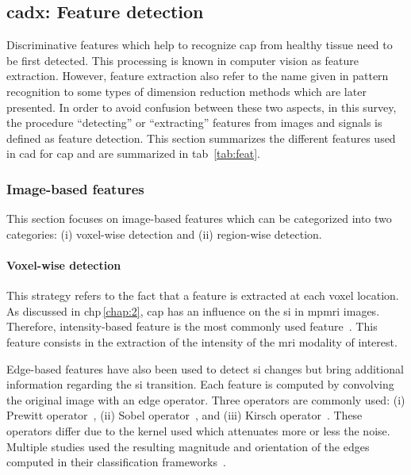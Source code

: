 \subsection{\acs*{cadx}: Feature detection} \label{subsec:chp3:img-clas:CADX-fea-dec}

Discriminative features which help to recognize \ac{cap} from healthy tissue need to be first detected.
This processing is known in computer vision as feature extraction. 
However, feature extraction also refer to the name given in pattern recognition to some types of dimension reduction methods which are later presented.
In order to avoid confusion between these two aspects, in this survey, the procedure ``detecting'' or ``extracting'' features from images and signals is defined as feature detection.
This section summarizes the different features used in \ac{cad} for \ac{cap} and are summarized in \acs{tab}~\ref{tab:feat}.  



\subsubsection{Image-based features}\label{subsubsec:chp3:img-clas:CADX-fea-dec:Img-fea}

This section focuses on image-based features which can be categorized into two categories: (i) voxel-wise detection and (ii) region-wise detection.

\paragraph{Voxel-wise detection}
This strategy refers to the fact that a feature is extracted at each voxel location.
As discussed in \acs{chp}\,\ref{chap:2}, \ac{cap} has an influence on the \ac{si} in \ac{mpmri} images.
Therefore, intensity-based feature is the most commonly used feature~\cite{Ampeliotis2007,Ampeliotis2008,Vos2008,rampun2016computerb,rampun2015classifying,Giannini2013,Artan2009,Artan2010,Chan2003,Langer2009,Litjens2011,Litjens2012,Litjens2014,Liu2009,Ozer2009,Ozer2010,trigui2016classification,trigui2017automatic,cameron2014multiparametric,cameron2016maps,khalvati2015automated,chung2015prostate,giannini2015fully,Niaf2011,Niaf2012,lehaire2014computer}.
This feature consists in the extraction of the intensity of the \ac{mri} modality of interest.

Edge-based features have also been used to detect \ac{si} changes but bring additional information regarding the \ac{si} transition.
Each feature is computed by convolving the original image with an edge operator.
Three operators are commonly used: (i) Prewitt operator~\cite{Prewitt1970}, (ii) Sobel operator~\cite{Sobel1970}, and (iii) Kirsch operator~\cite{Kirsch1971}.
These operators differ due to the kernel used which attenuates more or less the noise.
Multiple studies used the resulting magnitude and orientation of the edges computed in their classification frameworks~\cite{Niaf2011,Niaf2012,Tiwari2009a,Tiwari2010,Tiwari2013,Viswanath2008,Viswanath2011,rampun2016quantitative,rampun2015computer,rampun2016computer,lehaire2014computer,khalvati2015automated,chung2015prostate}.

